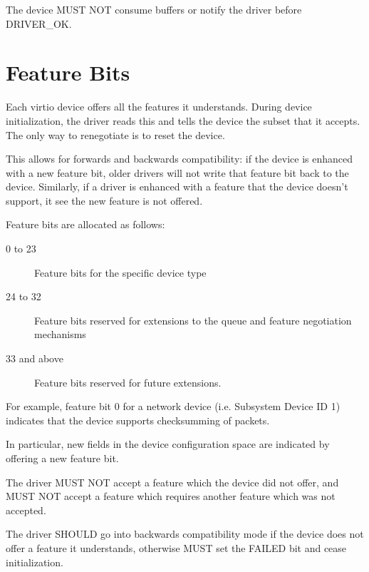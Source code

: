 The device MUST NOT consume buffers or notify the driver before DRIVER_OK.

\section{Feature Bits}\label{sec:Basic Facilities of a Virtio Device / Feature Bits}

Each virtio device offers all the features it understands.  During
device initialization, the driver reads this and tells the device the
subset that it accepts.  The only way to renegotiate is to reset
the device.

This allows for forwards and backwards compatibility: if the device is
enhanced with a new feature bit, older drivers will not write that
feature bit back to the device.  Similarly, if a driver is enhanced with a feature
that the device doesn't support, it see the new feature is not offered.

Feature bits are allocated as follows:

\begin{description}
\item[0 to 23] Feature bits for the specific device type

\item[24 to 32] Feature bits reserved for extensions to the queue and
  feature negotiation mechanisms

\item[33 and above] Feature bits reserved for future extensions.
\end{description}

\begin{note}
For example, feature bit 0 for a network device (i.e. Subsystem
Device ID 1) indicates that the device supports checksumming of
packets.
\end{note}

In particular, new fields in the device configuration space are
indicated by offering a new feature bit.

The driver MUST NOT accept a feature which the device did not offer,
and MUST NOT accept a feature which requires another feature which was
not accepted.

The driver SHOULD go into backwards compatibility mode
if the device does not offer a feature it understands, otherwise MUST
set the FAILED  bit and cease initialization.

